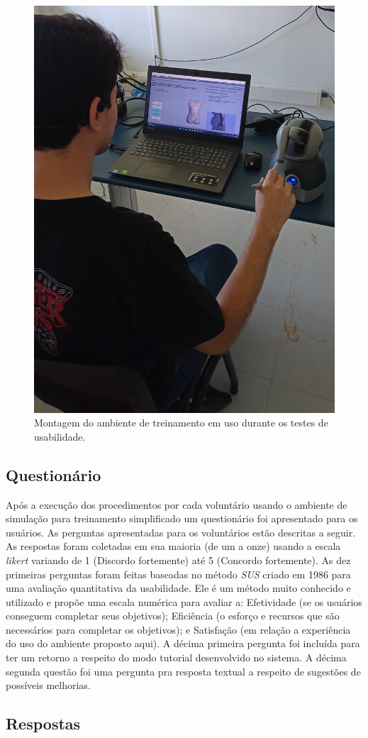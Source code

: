 \begin{figure}[ht!]
    \centering
    \includegraphics[width=0.4\linewidth]{capitulos/figuras/montagem-teste-usabilidade.jpg} 
    \caption{Montagem do ambiente de treinamento em uso durante os testes de usabilidade.}
    \label{fig:montagemTesteUsabilidade}
\end{figure}

\subsection{Questionário}
\label{sec:questionarioUsabilidade}

Após a execução dos procedimentos por cada voluntário usando o ambiente de simulação para treinamento simplificado um questionário foi apresentado para os usuários. As perguntas apresentadas para os voluntários estão descritas a seguir. As respostas foram coletadas em sua maioria (de um a onze) usando a escala \textit{likert} variando de 1 (Discordo fortemente) até 5 (Concordo fortemente). As dez primeiras perguntas foram feitas baseadas no método \textit{\acrfull{SUS}} \cite{Brooke2013} criado em 1986 para uma avaliação quantitativa da usabilidade. Ele é um método muito conhecido e utilizado e propõe uma escala numérica para avaliar a: Efetividade (se os usuários conseguem completar seus objetivos); 
Eficiência (o esforço e recursos que são necessários para completar os objetivos); e
Satisfação (em relação a experiência do uso do ambiente proposto aqui). A décima primeira pergunta foi incluída para ter um retorno a respeito do modo tutorial desenvolvido no sistema. A décima segunda questão foi uma pergunta pra resposta textual a respeito de sugestões de possíveis melhorias.

\subsection{Respostas}
\label{sec:respostasUsabilidade}

